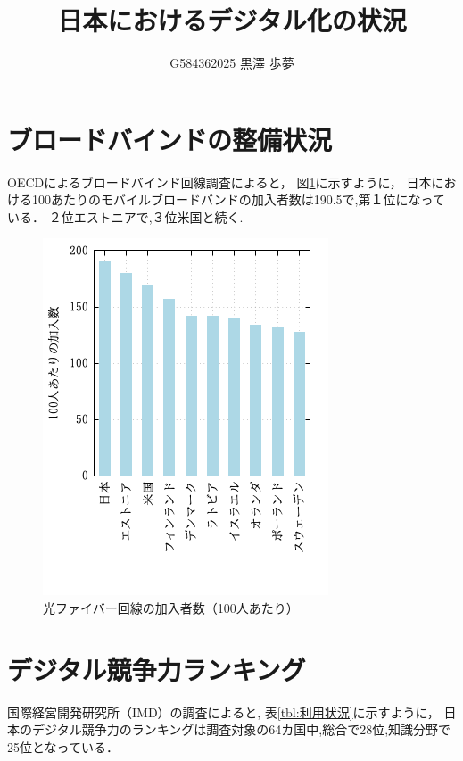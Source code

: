 \documentclass[a4paper,11pt,dvipdfmx]{ujarticle}
\title{日本におけるデジタル化の状況}
\author{G584362025 黒澤 歩夢}
\begin{document}
\maketitle %

\section{ブロードバインドの整備状況}
OECDによるブロードバインド回線調査\cite{oecd}によると，
図\ref{fig:加入者数}に示すように，
日本における100あたりのモバイルブロードバンドの加入者数は190.5で,第１位になっている．
２位エストニアで,３位米国と続く.

\begin{figure}[htbp]
    \centering
    \includegraphics[width=0.6\linewidth]{fig21.png}
    \caption{光ファイバー回線の加入者数（100人あたり）}\label{fig:加入者数}
\end{figure}

\section{デジタル競争力ランキング}

国際経営開発研究所（IMD）の調査\cite{imd}によると,
表\ref{tbl:利用状況}に示すように，
日本のデジタル競争力のランキングは調査対象の64カ国中,総合で28位,知識分野で25位となっている．
\end{document}

